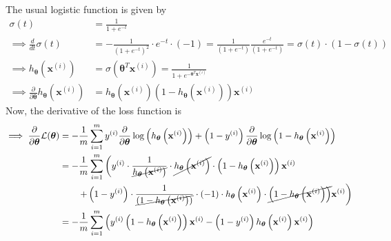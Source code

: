 The usual logistic function is given by
\begin{align*}
    \sigma\left(t\right)
     & =
    \frac{1}{1+e^{-t}}
    \\
    \implies
    \frac{d}{dt} \sigma\left(t\right)
     & =
    -\frac{1}{{\left(1+e^{-t}\right)}^2} \cdot e^{-t} \cdot (-1)
    =
    \frac{1}{\left(1+e^{-t}\right)}
    \frac{e^{-t}}{\left(1+e^{-t}\right)}
    =
    \sigma\left(t\right) \cdot \left(1-\sigma\left(t\right)\right)
    \\
    \implies
    h_{\boldsymbol{\theta}}\left(\mathbf{x}^{(i)}\right)
     & =
    \sigma\left(\boldsymbol{\theta}^{T} \mathbf{x}^{(i)}\right)
    =
    \frac{1}{1+e^{-\boldsymbol{\theta}^{T} \mathbf{x}^{(i)}}}
    \\
    \implies
    \frac{\partial}{\partial \boldsymbol{\theta}} h_{\boldsymbol{\theta}}\left(\mathbf{x}^{(i)}\right)
     & =
    h_{\boldsymbol{\theta}}\left(\mathbf{x}^{(i)}\right) \left(1-h_{\boldsymbol{\theta}}\left(\mathbf{x}^{(i)}\right)\right) \mathbf{x}^{(i)}
\end{align*}
Now, the derivative of the loss function is
\begin{align*}
    \implies
    \frac{\partial}{\partial \boldsymbol{\theta}} \mathcal{L}(\boldsymbol{\theta})
     & =
    -\frac{1}{m} \sum_{i=1}^{m}
    y^{(i)} \frac{\partial}{\partial \boldsymbol{\theta}} \log \left(h_{\boldsymbol{\theta}}\left(\mathbf{x}^{(i)}\right)\right)
    +
    \left(1-y^{(i)}\right) \frac{\partial}{\partial \boldsymbol{\theta}} \log \left(1-h_{\boldsymbol{\theta}}\left(\mathbf{x}^{(i)}\right)\right)
    \\ & =
    -\frac{1}{m} \sum_{i=1}^{m}
    \left(
    y^{(i)}
    \cdot \frac{1}{\cancel{h_{\boldsymbol{\theta}}\left(\mathbf{x}^{(i)}\right)}}
    \cdot \cancel{h_{\boldsymbol{\theta}}\left(\mathbf{x}^{(i)}\right)}
    \cdot \left(1-h_{\boldsymbol{\theta}}\left(\mathbf{x}^{(i)}\right)\right)
    \mathbf{x}^{(i)}
    \right.
    \\ & \qquad
    \left.
    +
    \left(1-y^{(i)}\right)
    \cdot \frac{1}{\cancel{(1-h_{\boldsymbol{\theta}}\left(\mathbf{x}^{(i)}\right))}}
    \cdot (-1)
    \cdot h_{\boldsymbol{\theta}}\left(\mathbf{x}^{(i)}\right)
    \cdot \cancel{\left(1-h_{\boldsymbol{\theta}}\left(\mathbf{x}^{(i)}\right)\right)}
    \mathbf{x}^{(i)}
    \right)
    \\ & =
    -\frac{1}{m} \sum_{i=1}^{m}
    \left(
    y^{(i)} \left(1-h_{\boldsymbol{\theta}}\left(\mathbf{x}^{(i)}\right)\right) \mathbf{x}^{(i)}
    -
    \left(1-y^{(i)}\right) h_{\boldsymbol{\theta}}\left(\mathbf{x}^{(i)}\right) \mathbf{x}^{(i)}
    \right)
\end{align*}
